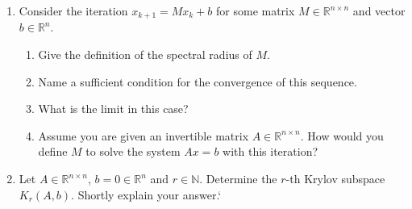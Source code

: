 \begin{enumerate}
	\item Consider the iteration $x_{k+1} = Mx_k + b$ for some matrix $M \in \mathbb{R}^{n \times n}$ and vector $b \in \mathbb{R}^n$. 
	\begin{enumerate}
		\item Give the definition of the spectral radius of $M$.
		\item Name a sufficient condition for the convergence of this sequence.
		\item What is the limit in this case? 
		\item Assume you are given an invertible matrix $A \in \mathbb{R}^{n \times n}$. How would you define $M$ to solve the system $Ax=b$ with this iteration?
	\end{enumerate} 
	\item Let $A \in \mathbb{R}^{n \times n}$, $b = 0\in \mathbb{R}^{n}$ and $r\in \mathbb{N}$. Determine the $r$-th Krylov subspace $K_r(A,b)$. Shortly explain your answer.`
\end{enumerate}
 